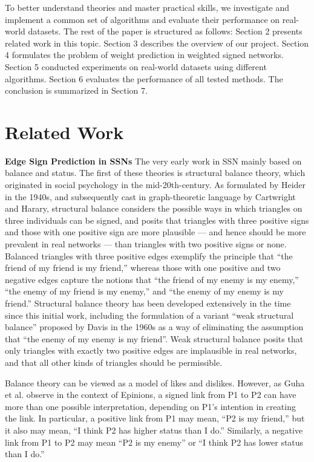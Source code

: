 \documentclass{article}
\begin{document}
To better understand theories and master practical skills, we investigate and implement a common set of algorithms and evaluate their performance on real-world datasets. The rest of the paper is structured as follows: Section 2 presents related work in this topic. Section 3 describes the overview of our project. Section 4 formulates the problem of weight prediction in weighted signed networks. Section 5 conducted experiments on real-world datasets using different algorithms. Section 6 evaluates the performance of all tested methods. The conclusion is summarized in Section 7.


\section{Related Work}
\textbf{Edge Sign Prediction in SSNs} The very early work in SSN mainly based on balance and status. The first of these theories is structural balance theory, which originated in social psychology in the mid-20th-century. As formulated by Heider in the 1940s\cite{heider1940}, and subsequently cast in graph-theoretic language by Cartwright and Harary\cite{Cartwright1956-CARSBA-4}, structural balance considers the possible ways in which triangles on three individuals can be signed, and posits that triangles with three positive signs and those with one positive sign are more plausible — and hence should be more prevalent in real networks — than triangles with two positive signs or none. Balanced triangles with three positive edges exemplify the principle that “the friend of my friend is my friend,” whereas those with one positive and two negative edges capture the notions that “the friend of my enemy is my enemy,” “the enemy of my friend is my enemy,” and “the enemy of my enemy is my friend.” Structural balance theory has been developed extensively in the time since this initial work\cite{wasserman1994social}, including the formulation of a variant “weak structural balance” proposed by Davis in the 1960s \cite{Davis1967}as a way of eliminating the assumption that “the enemy of my enemy is my friend”. Weak structural balance posits that only triangles with exactly two positive edges are implausible in real networks, and that all other kinds of triangles should be permissible.

Balance theory can be viewed as a model of likes and dislikes. However, as Guha et al. observe in the context of Epinions\cite{Guha:2004:PTD:988672.988727}, a signed link from P1 to P2 can have more than one possible interpretation, depending on P1’s intention in creating the link. In particular, a positive link from P1 may mean, “P2 is my friend,” but it also may mean, “I think P2 has higher status than I do.” Similarly, a negative link from P1 to P2 may mean “P2 is my enemy” or “I think P2 has lower status than I do.”
\end{document}

